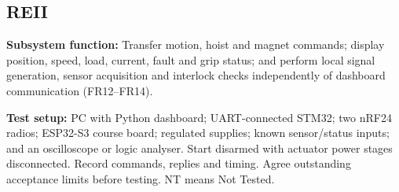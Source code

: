 \clearpage
\subsection{REII}
\label{subsec:reii-tests}

\textbf{Subsystem function:}
Transfer motion, hoist and magnet commands; display
position, speed, load, current, fault and grip status;
and perform local signal generation, sensor acquisition
and interlock checks independently of dashboard
communication (FR12--FR14).
\cite{nwu_sysrs2026,nwu_reii_scope2026}

\textbf{Test setup:}
PC with Python dashboard; UART-connected STM32;
two nRF24 radios; ESP32-S3 course board; regulated
supplies; known sensor/status inputs; and an oscilloscope
or logic analyser. Start disarmed with actuator power
stages disconnected. Record commands, replies and timing.
Agree outstanding acceptance limits before testing.
NT means Not Tested.

